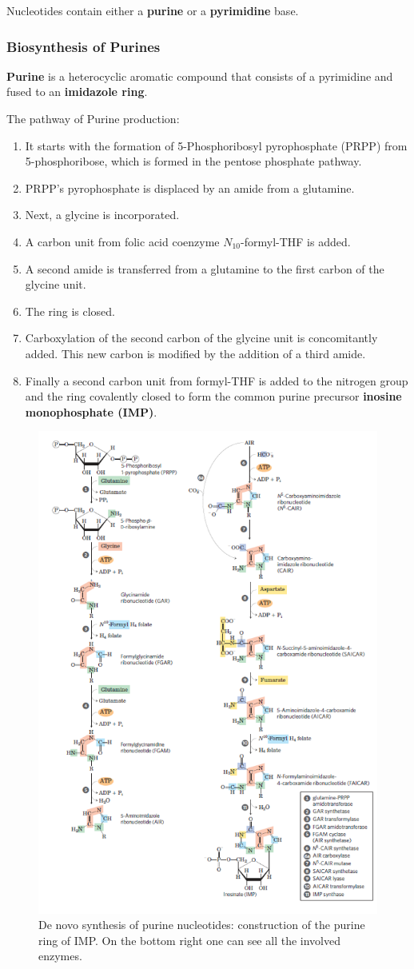 \documentclass[../main.tex]{subfiles}
\begin{document}
Nucleotides contain either a \textbf{purine} or a \textbf{pyrimidine} base.  

\subsubsection{Biosynthesis of Purines}

\textbf{\gls{Purine}} is a heterocyclic aromatic compound that consists of a pyrimidine and fused to an \textbf{imidazole ring}.

The pathway of Purine production:
\begin{enumerate}
	\item It starts with the formation of 5-Phosphoribosyl pyrophosphate (PRPP) from 5-phosphoribose, which is formed in the pentose phosphate pathway.
	\item PRPP's pyrophosphate is displaced by an amide from a glutamine.
	\item Next, a glycine is incorporated.
	\item A carbon unit from folic acid coenzyme $N_{10}$-formyl-THF is added.
	\item A second amide is transferred from a glutamine to the first carbon of the glycine unit.
	\item The ring is closed.
	\item Carboxylation of the second carbon of the glycine unit is concomitantly added. This new carbon is modified by the addition of a third amide.
	\item Finally a second carbon unit from formyl-THF is added to the nitrogen group and the ring covalently closed to form the common purine precursor \textbf{\gls{inosine monophosphate (IMP)}}.
\end{enumerate} 

\begin{figure}[H]
	\centering
	\includegraphics[width=0.6\linewidth]{puri_path1}
	\caption{De novo synthesis of purine nucleotides: construction of the purine ring of IMP. On the bottom right one can see all the involved enzymes.}
	\label{fig:puripath1}
\end{figure}
\end{document}
